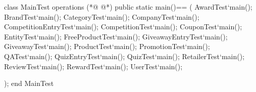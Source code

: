 \begin{vdmpp}[breaklines=true]
class MainTest
 operations
(*@
\label{main:3}
@*)
  public static main()==
    (
     AwardTest`main();
   BrandTest`main();
   CategoryTest`main();
   CompanyTest`main();
   CompetitionEntryTest`main();
   CompetitionTest`main();
   CouponTest`main();
   EntityTest`main();
   FreeProductTest`main();
   GiveawayEntryTest`main();
   GiveawayTest`main();
   ProductTest`main();
   PromotionTest`main();
   QATest`main();
   QuizEntryTest`main();
   QuizTest`main();
   RetailerTest`main();
   ReviewTest`main();
   RewardTest`main();
   UserTest`main();
   
    );
end MainTest
\end{vdmpp}
